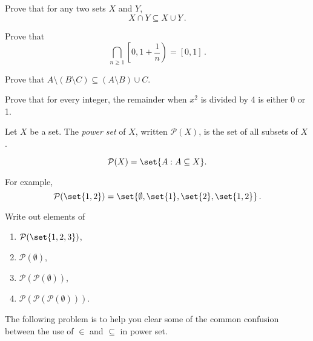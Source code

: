 \documentclass[12pt]{amsart}
\begin{document}
\begin{problem}
Prove that for any two sets $X$ and $Y$,
\begin{equation*}
	X\cap Y \subseteq X \cup Y \,.
\end{equation*}
\vspace{5cm}
\end{problem}

\begin{problem}
Prove that
\begin{equation*}
	\bigcap_{n\geq 1} \left[ 0, 1+ \frac{1}{n} \right) = [0,1] \,.
\end{equation*}
\vspace{5cm}
\end{problem}

\begin{problem}
Prove that $A \setminus (B \setminus C) \subseteq (A \setminus B) \cup C$.
\vspace{5cm}
\end{problem}


\begin{problem}
Prove that for every integer, the remainder when $x^2$ is divided by 4 is either 0 or 1.
\end{problem}
\vspace{5cm}

\begin{definition}
	Let $X$ be a set. The \emph{power set} of $X$, written $\mathcal{P}(X)$, is the set of all subsets of $X$.

	$$\mathcal{P}(X) = \set{ A: A \subseteq  X }.$$

	For example, $$\mathcal{P}(\set{1,2}) = \set{ \emptyset, \set{1}, \set{2}, \set{1,2}}\,.$$
\end{definition}

\begin{problem}
Write out elements of
\begin{enumerate}
	\item  $\mathcal{P}(\set{1,2,3})$,
	\item $\mathcal{P}(\emptyset)$,
	\item $\mathcal{P}(\mathcal{P}(\emptyset))$,
	\item $\mathcal{P}(\mathcal{P}(\mathcal{P}(\emptyset)))$.
\end{enumerate}
\end{problem}
\vspace{5cm}

The following problem is to help you clear some of the common confusion between
the use of $\in$ and $\subseteq$ in power set.
\end{document}
